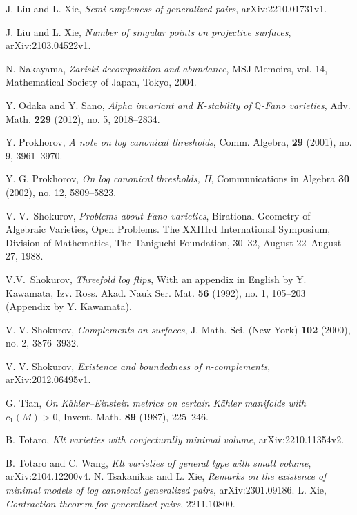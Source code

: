 \documentclass[11pt]{amsart}
\numberwithin{equation}{section}
\theoremstyle{definition}
\theoremstyle{definition}
\theoremstyle{definition}
\begin{document}
\begin{thebibliography}{ABCDE}
 J. Liu and L. Xie, \textit{Semi-ampleness of generalized pairs}, arXiv:2210.01731v1.


 J. Liu and L. Xie, \textit{Number of singular points on projective surfaces}, arXiv:2103.04522v1.



 N. Nakayama, \textit{Zariski-decomposition and abundance}, MSJ Memoirs, vol. 14, Mathematical Society of Japan, Tokyo, 2004.

 Y. Odaka and Y. Sano, \textit{Alpha invariant and K-stability of $\mathbb Q$-Fano varieties},  Adv. Math. \textbf{229} (2012), no. 5, 2018--2834.

 Y. Prokhorov, \textit{A note on log canonical thresholds}, Comm. Algebra, \textbf{29} (2001), no. 9, 3961--3970.

 Y. G. Prokhorov, \textit{On log canonical thresholds, II}, Communications in Algebra \textbf{30} (2002), no. 12, 5809--5823.

 V. V.~Shokurov, \textit{Problems about Fano varieties}, Birational Geometry of Algebraic Varieties, Open Problems. The XXIIIrd International Symposium, Division of Mathematics, The Taniguchi Foundation, 30--32, August 22--August 27, 1988.

 V.V.~Shokurov, \textit{Threefold log flips}, With an appendix in English by Y. Kawamata, Izv. Ross. Akad. Nauk Ser. Mat. \textbf{56} (1992), no. 1, 105--203 (Appendix by Y. Kawamata).


 V. V. Shokurov, \textit{Complements on surfaces}, J. Math. Sci. (New York) \textbf{102} (2000), no. 2, 3876--3932.

 V. V. Shokurov, \textit{Existence and boundedness of n-complements}, arXiv:2012.06495v1.

 G. Tian, \textit{On K\"ahler–Einstein metrics on certain K\"ahler manifolds with $c_1(M)>0$}, Invent. Math. \textbf{89} (1987), 225--246.

 B. Totaro, \textit{Klt varieties with conjecturally minimal volume}, arXiv:2210.11354v2.

 B. Totaro and C. Wang, \textit{Klt varieties of general type with small volume}, arXiv:2104.12200v4.
 N. Tsakanikas and L. Xie, \textit{Remarks on the existence of minimal models of log canonical generalized pairs}, arXiv:2301.09186.
 L. Xie, \textit{Contraction theorem for generalized pairs}, 2211.10800.

\end{thebibliography}
\end{document}
